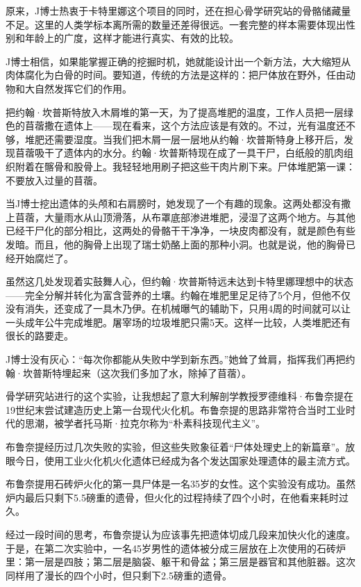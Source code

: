 \documentclass[12pt,oneside]{book}
\begin{document}
\begin{bookref}[frametitle={\cite{好好告别：世界葬礼观察手记}}]
原来，J博士热衷于卡特里娜这个项目的同时，还在担心骨学研究站的骨骼储藏量不足。这里的人类学标本离所需的数量还差得很远。一套完整的样本需要体现出性别和年龄上的广度，这样才能进行真实、有效的比较。

J博士相信，如果能掌握正确的挖掘时机，她就能设计出一个新方法，大大缩短从肉体腐化为白骨的时间。要知道，传统的方法是这样的：把尸体放在野外，任由动物和大自然发挥它们的作用。

把约翰·坎普斯特放入木屑堆的第一天，为了提高堆肥的温度，工作人员把一层绿色的苜蓿撒在遗体上——现在看来，这个方法应该是有效的。不过，光有温度还不够，堆肥还需要湿度。当我们把木屑一层一层地从约翰·坎普斯特身上移开后，发现苜蓿吸干了遗体内的水分。约翰·坎普斯特现在成了一具干尸，白纸般的肌肉组织附着在髂骨和股骨上。我轻轻地用刷子把这些干肉片刷下来。尸体堆肥第一课：不要放入过量的苜蓿。

当J博士挖出遗体的头颅和右肩膀时，她发现了一个有趣的现象。这两处都没有撒上苜蓿，大量雨水从山顶滑落，从布罩底部渗进堆肥，浸湿了这两个地方。与其他已经干尸化的部分相比，这两处的骨骼干干净净，一块皮肉都没有，就是颜色有些发暗。而且，他的胸骨上出现了瑞士奶酪上面的那种小洞。也就是说，他的胸骨已经开始腐烂了。

虽然这几处发现着实鼓舞人心，但约翰·坎普斯特远未达到卡特里娜理想中的状态——完全分解并转化为富含营养的土壤。约翰在堆肥里足足待了5个月，但他不仅没有消失，还变成了一具木乃伊。在机械曝气的辅助下，只用4周的时间就可以让一头成年公牛完成堆肥。屠宰场的垃圾堆肥只需5天。这样一比较，人类堆肥还有很长的路要走。

J博士没有灰心：“每次你都能从失败中学到新东西。”她耸了耸肩，指挥我们再把约翰·坎普斯特埋起来（这次我们多加了水，除掉了苜蓿）。

骨学研究站进行的这个实验，让我想起了意大利解剖学教授罗德维科·布鲁奈提在19世纪末尝试建造历史上第一台现代火化机。布鲁奈提的思路非常符合当时工业时代的思潮，被学者托马斯·拉克尔称为“朴素科技现代主义”。

布鲁奈提经历过几次失败的实验，但这些失败象征着“尸体处理史上的新篇章”。放眼今日，使用工业火化机火化遗体已经成为各个发达国家处理遗体的最主流方式。

布鲁奈提用石砖炉火化的第一具尸体是一名35岁的女性。这个实验没有成功。虽然炉内最后只剩下5.5磅重的遗骨，但火化的过程持续了四个小时，在他看来耗时过久。

经过一段时间的思考，布鲁奈提认为应该事先把遗体切成几段来加快火化的速度。于是，在第二次实验中，一名45岁男性的遗体被分成三层放在上次使用的石砖炉里：第一层是四肢；第二层是脑袋、躯干和骨盆；第三层是器官和其他脏器。这次同样用了漫长的四个小时，但只剩下2.5磅重的遗骨。


\end{bookref}
\end{document}
